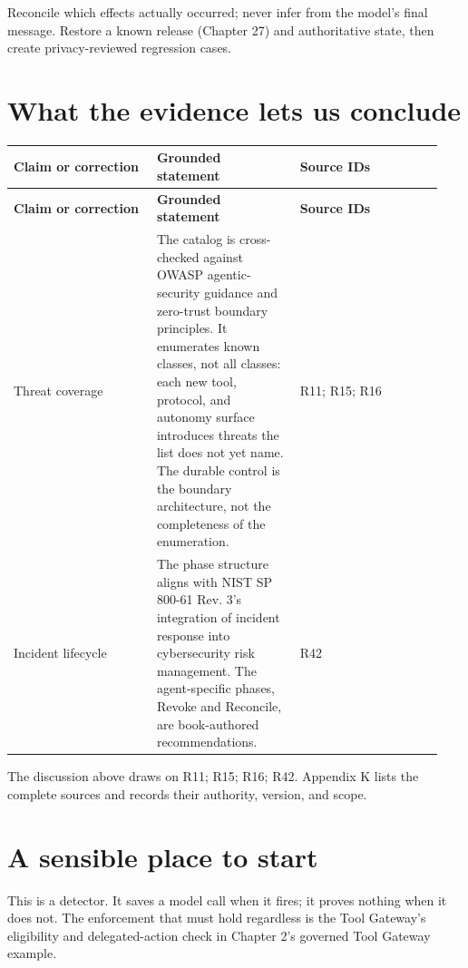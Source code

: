 Reconcile which effects actually occurred; never infer from the model's final message. Restore a known release (Chapter 27) and authoritative state, then create privacy-reviewed regression cases.\par

\section{What the evidence lets us conclude}

\BookTableStart
\small
\begin{longtable}{@{}Y{0.3133\linewidth}Y{0.3133\linewidth}Y{0.3133\linewidth}@{}}
\color{white}\bfseries \textbf{Claim or correction} & \color{white}\bfseries \textbf{Grounded statement} & \color{white}\bfseries \textbf{Source IDs} \\
\endfirsthead
{}
\color{white}\bfseries \textbf{Claim or correction} & \color{white}\bfseries \textbf{Grounded statement} & \color{white}\bfseries \textbf{Source IDs} \\
\endhead
Threat coverage & The catalog is cross-checked against OWASP agentic-security guidance and zero-trust boundary principles. It enumerates known classes, not all classes: each new tool, protocol, and autonomy surface introduces threats the list does not yet name. The durable control is the boundary architecture, not the completeness of the enumeration. & R11; R15; R16 \\
Incident lifecycle & The phase structure aligns with NIST SP 800-61 Rev. 3's integration of incident response into cybersecurity risk management. The agent-specific phases, Revoke and Reconcile, are book-authored recommendations. & R42 \\
\end{longtable}
\BookTableEnd

The discussion above draws on R11; R15; R16; R42. Appendix K lists the complete sources and records their authority, version, and scope.\par

\section{A sensible place to start}

This is a detector. It saves a model call when it fires; it proves nothing when it does not. The enforcement that must hold regardless is the Tool Gateway's eligibility and delegated-action check in Chapter 2's governed Tool Gateway example.\par

